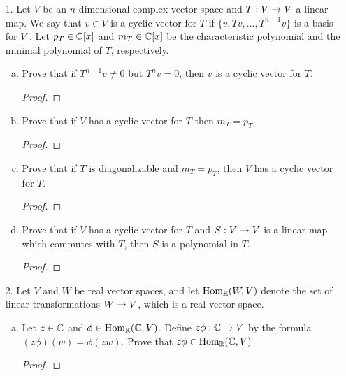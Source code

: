 
\begin{itemize}

\item[1.] Let $V$ be an $n$-dimensional complex vector space and $T : V \rightarrow V$ a linear map.
We say that $v \in V$ is a cyclic vector for $T$ if $\{v, T v, . . . , T^{n-1} v\}$ is a basis for $V$ .
Let $p_T \in \mathbb{C}[x]$ and $m_T \in \mathbb{C}[x]$ be the characteristic polynomial and the minimal
polynomial of $T$, respectively.
\begin{enumerate}[(a)]
    \item Prove that if $T^{n-1}v \neq 0$ but $T^n v = 0$, then $v$ is a cyclic vector for $T$.
    \begin{proof}

    \end{proof}
    
    \item Prove that if $V$ has a cyclic vector for $T$ then $m_T = p_T$.
    \begin{proof}

    \end{proof}
    
    \item Prove that if $T$ is diagonalizable and $m_T = p_T$, then $V$ has a cyclic vector for $T$.
    \begin{proof}

    \end{proof}
    
    \item Prove that if $V$ has a cyclic vector for $T$ and $S : V \rightarrow V$ is a linear map which commutes with $T$, then $S$ is a polynomial in $T$.
    \begin{proof}

    \end{proof}
\end{enumerate}







\item[2.] Let $V$ and $W$ be real vector spaces, and let $\operatorname{Hom}_{\mathbb{R}}(W, V)$ denote the set of linear
transformations $W \rightarrow V$, which is a real vector space.
\begin{enumerate}[(a)]
    \item Let $z \in \mathbb{C}$ and $\phi \in \operatorname{Hom}_{\mathbb{R}}(\mathbb{C}, V)$. Define $z\phi: \mathbb{C} \rightarrow V$ by the formula $(z\phi)(w) = \phi(zw)$. Prove that $z \phi \in \operatorname{Hom}_{\mathbb{R}}(\mathbb{C}, V)$.
    \begin{proof}


\end{proof}
\end{enumerate}
\end{itemize}
